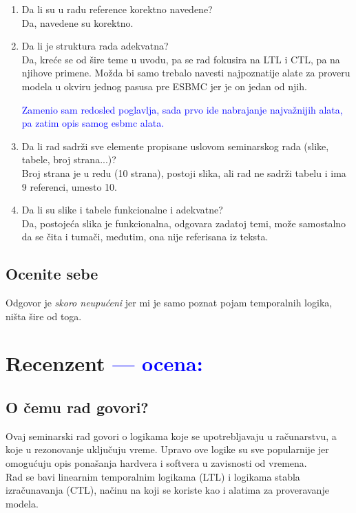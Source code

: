 \documentclass[a4paper]{report}
\newcommand{\odgovor}[1]{\textcolor{blue}{#1}}
\newcommand{\say}[1]{\textit{#1}}
\begin{document}
\begin{enumerate}
\item Da li su u radu reference korektno navedene?\\
Da, navedene su korektno. 


\item Da li je struktura rada adekvatna?\\
Da, kreće se od šire teme u uvodu, pa se rad fokusira na LTL i CTL, pa na njihove primene. Možda bi samo trebalo navesti najpoznatije alate za proveru modela u okviru jednog pasusa pre ESBMC jer je on jedan od njih.

\odgovor{Zamenio sam redosled poglavlja, sada prvo ide nabrajanje najvažnijih alata, pa zatim opis samog esbmc alata.}

\item Da li rad sadrži sve elemente propisane uslovom seminarskog rada (slike, tabele, broj strana...)?\\
Broj strana je u redu (10 strana), postoji slika, ali rad ne sadrži tabelu i ima 9 referenci, umesto 10.


\item Da li su slike i tabele funkcionalne i adekvatne?\\
Da, postojeća slika je funkcionalna, odgovara zadatoj temi, može samostalno da se čita i tumači, međutim, ona nije referisana iz teksta.
\end{enumerate}

\section{Ocenite sebe}

Odgovor je \say{skoro neupućeni} jer mi je samo poznat pojam temporalnih logika, ništa šire od toga. 

\chapter{Recenzent \odgovor{--- ocena:} }

\section{O čemu rad govori?}

Ovaj seminarski rad govori o logikama koje se upotrebljavaju u računarstvu, a koje u rezonovanje uključuju vreme. Upravo ove logike su sve popularnije jer omogućuju opis ponašanja hardvera i softvera u zavisnosti od vremena.
\\Rad se bavi linearnim temporalnim logikama (LTL) i logikama stabla iz\-ra\-ču\-na\-va\-nja (CTL), načinu na koji se koriste kao i alatima za proveravanje modela.
\end{document}
